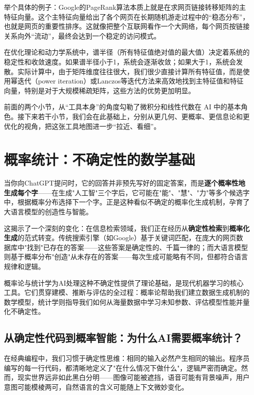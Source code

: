 举个具体的例子：Google的PageRank算法本质上就是在求网页链接转移矩阵的主特征向量。这个主特征向量给出了各个网页在长期随机游走过程中的“稳态分布”，也就是网页的重要性排序。这就像把整个互联网看作一个大网络，每个网页按链接关系向外“流动”，最终会达到一个稳定的访问模式。

在优化理论和动力学系统中，谱半径（所有特征值绝对值的最大值）决定着系统的稳定性和收敛速度。如果谱半径小于1，系统会逐渐收敛；如果大于1，系统会发散。实际计算中，由于矩阵维度往往很大，我们很少直接计算所有特征值，而是使用幂迭代（power iteration）或Lanczos等迭代方法来高效地找到主特征值和特征向量，特别是对于大规模稀疏矩阵，这些方法的优势更加明显。

前面的两个小节，从“工具本身”的角度勾勒了微积分和线性代数在 AI 中的基本角色。接下来若干小节，我们会在此基础上，分别从更几何、更概率、更信息论和更优化的视角，把这张工具地图进一步“拉近、看细”。

\section{概率统计：不确定性的数学基础}


当你向ChatGPT提问时，它的回答并非预先写好的固定答案，而是\textbf{逐个概率性地生成每个字}——在生成"人工智"三个字后，它可能在"能"、"慧"、"力"等多个候选字中，根据概率分布选择下一个字。正是这种看似不确定的概率化生成机制，孕育了大语言模型的创造性与智能。

这揭示了一个深刻的变化：在信息检索领域，我们正在经历从\textbf{确定性检索}到\textbf{概率化生成}的范式转变。传统搜索引擎（如Google）基于关键词匹配，在庞大的网页数据库中"找到"已存在的答案——这些答案是确定性的、千篇一律的；而大语言模型则基于概率分布"创造"从未存在的答案——每次生成可能略有不同，但都符合语言规律和逻辑。

概率论与统计学为AI处理这种不确定性提供了理论基础，是现代机器学习的核心工具。它们贯穿建模、推断与评估的全过程：概率论帮助我们建立数据生成机制的数学模型，统计学则指导我们如何从海量数据中学习未知参数、评估模型性能并量化不确定性。

\subsection{从确定性代码到概率智能：为什么AI需要概率统计？}

在经典编程中，我们习惯于确定性思维：相同的输入必然产生相同的输出。程序员编写的每一行代码，都清晰地定义了"在什么情况下做什么"，逻辑严密而确定。然而，现实世界远非如此黑白分明——图像可能被遮挡，语音可能有背景噪声，用户意图可能模棱两可，自然语言的含义可能随上下文微妙变化。

